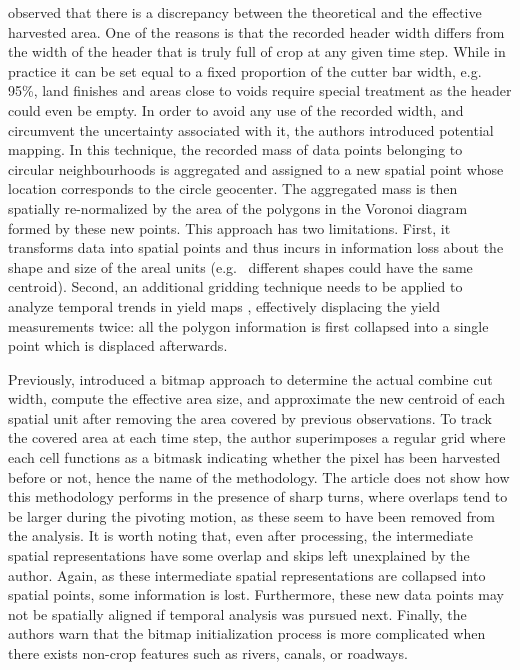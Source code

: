\documentclass[12pt]{article}
\begin{document}
\cite{Blackmore1999} observed that there is a discrepancy between the
theoretical and the effective harvested area. One of the reasons is
that the recorded header width differs from the width of the header
that is truly full of crop at any given time step. While in practice it
can be set equal to a fixed proportion of the cutter bar width,
e.g. 95\%, land finishes and areas close to voids require special
treatment as the header could even be empty. In order to avoid any use
of the recorded width, and circumvent the uncertainty associated with
it, the authors introduced potential mapping. In this technique, the
recorded mass of data points belonging to circular neighbourhoods is
aggregated and assigned to a new spatial point whose location
corresponds to the circle geocenter. The aggregated mass is then
spatially re-normalized by the area of the polygons in the Voronoi
diagram formed by these new points. This approach has two
limitations. First, it transforms data into spatial points and thus
incurs in information loss about the shape and size of the
areal units (e.g. \ different shapes could have the
same centroid). Second, an additional gridding technique needs to be
applied to analyze temporal trends in yield maps
\citep{Blackmore2003}, effectively displacing the yield measurements
twice: all the polygon information is first collapsed into a single
point which is displaced afterwards.

Previously, \cite{Han1997} introduced a bitmap approach to determine
the actual combine cut width, compute the effective area size, and
approximate the new centroid of each spatial unit after removing the
area covered by previous observations. To track the covered area at
each time step, the author superimposes a regular grid where each cell
functions as a bitmask indicating whether the pixel has been harvested
before or not, hence the name of the methodology. The article does not
show how this methodology performs in the presence of sharp turns,
where overlaps tend to be larger during the pivoting motion, as these
seem to have been removed from the analysis. It is worth noting that,
even after processing, the intermediate spatial representations have
some overlap and skips left unexplained by the author. Again, as these
intermediate spatial representations are collapsed into spatial
points, some information is lost. Furthermore, these new data points
may not be spatially aligned if temporal analysis was pursued
next. Finally, the authors warn that the bitmap initialization process
is more complicated when there exists non-crop features such as
rivers, canals, or roadways.
\end{document}
